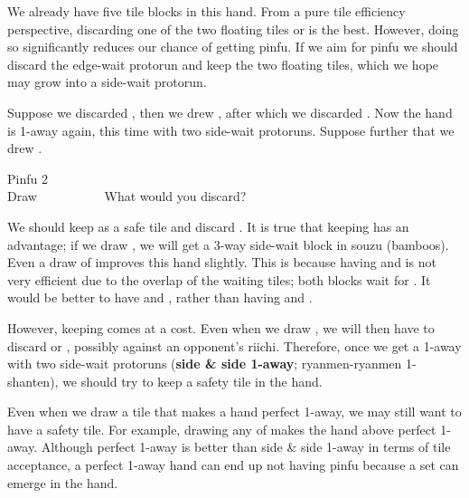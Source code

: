 \bigskip
We already have five tile blocks in this hand. From a pure tile efficiency perspective, discarding one of the two floating tiles {\LARGE{}} or {\LARGE{}} is the best. However, doing so significantly reduces our chance of getting {\jap pinfu}. If we aim for {\jap pinfu} we should discard the edge-wait protorun {\LARGE{}} and keep the two floating tiles, which we hope may grow into a side-wait protorun. 

\bigskip
Suppose we discarded {\LARGE{}}, then we drew {\LARGE{}}, after which we discarded {\LARGE{}}. Now the hand is 1-away again, this time with two side-wait protoruns. Suppose further that we drew {\LARGE\xi}. 

\bigskip
\begin{itembox}[r]{{\jap Pinfu} 2}
\bp
{}~\xi\\
\hfill\footnotesize{Draw~~~~~~~~~~}
\ep
\vspace{-17pt}What would you discard? \vspace{-5pt}
\end{itembox}

\bigskip
We should keep {\LARGE\xi} as a safe tile and discard {\LARGE{}}. It is true that keeping {\LARGE{}} has an advantage; if we draw {\LARGE{}}, we will get a 3-way side-wait block in {\jap souzu} (bamboos). Even a draw of {\LARGE{}} improves this hand slightly. This is because having {\LARGE{}} and {\LARGE{}} is not very efficient due to the overlap of the waiting tiles; both blocks wait for {\LARGE{}}. It would be better to have {\LARGE{}} and {\LARGE{}}, rather than having {\LARGE{}} and {\LARGE{}}.

\bigskip
However, keeping {\LARGE{}} comes at a cost. Even when we draw {\LARGE{}}, we will then have to discard {\LARGE{}} or {\LARGE{}}, possibly against an opponent's riichi. 
Therefore, once we get a 1-away with two side-wait protoruns ({\bf side \& side 1-away}; {\jap ryanmen-ryanmen 1-shanten}), we should try to keep a safety tile in the hand.

\bigskip
Even when we draw a tile that makes a hand perfect 1-away, we may still want to have a safety tile. For example, drawing any of {\LARGE{}} makes the hand above perfect 1-away. 
Although perfect 1-away is better than side \& side 1-away in terms of tile acceptance, a perfect 1-away hand can end up not having {\jap pinfu} because a set can emerge in the hand. 

